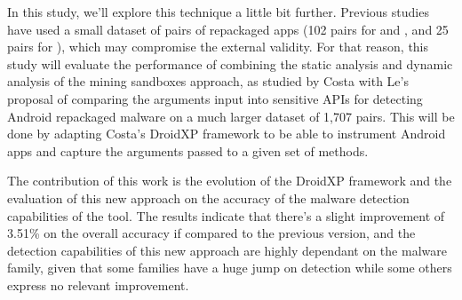 In this study, we'll explore this technique a little bit further. Previous studies have used a small dataset of pairs of repackaged apps (102 pairs for \cite{bao_mining_2018} and \cite{costa_exploring_2022}, and 25 pairs for \cite{le_towards_2018}), which may compromise the external validity. For that reason, this study will evaluate the performance of combining the static analysis and dynamic analysis of the mining sandboxes approach, as studied by Costa \cite{costa_exploring_2022} with Le's proposal of comparing the arguments input into sensitive APIs \cite{le_towards_2018} for detecting Android repackaged malware on a much larger dataset of 1,707 pairs. This will be done by adapting Costa's DroidXP \cite{costa_droidxp_2020} framework to be able to instrument Android apps and capture the arguments passed to a given set of methods.

The contribution of this work is the evolution of the DroidXP framework and the evaluation of this new approach on the accuracy of the malware detection capabilities of the tool. The results indicate that there's a slight improvement of 3.51\% on the overall accuracy if compared to the previous version, and the detection capabilities of this new approach are highly dependant on the malware family, given that some families have a huge jump on detection while some others express no relevant improvement.